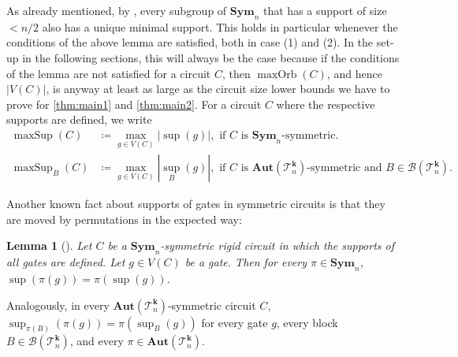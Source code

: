 \documentclass[11pt]{article}
\DeclareMathOperator{\supp}{sup}
\DeclareMathOperator{\maxSup}{maxSup}
\newcommand{\Aut}{\mathbf{Aut}}
\newcommand{\Sym}{\mathbf{Sym}}
\newcommand{\Bb}{{\mathcal B}}
\newcommand{\Oo}{{\mathcal O}}
\newcommand{\Tt}{{\mathcal T}}
\theoremstyle{definition}
\theoremstyle{plain}
\newtheorem{lemma}[definition]{Lemma}
\theoremstyle{remark}
\theoremstyle{remark}
\newcommand{\maxorb}{\operatorname{maxOrb}}
\renewcommand{\epsilon}{\varepsilon}
\begin{document}
As already mentioned, by \cite[Lemma 26]{blass1999choiceless}, every subgroup of $\Sym_n$ that has a support of size $< n/2$ also has a unique minimal support.
This holds in particular whenever the conditions of the above lemma are satisfied, both in case (1) and (2). In the set-up in the following sections, this will always be the case because if the conditions of the lemma are not satisfied for a circuit $C$, then $\maxorb(C)$, and hence $|V(C)|$, is anyway at least as large as the circuit size lower bounds we have to prove for \cref{thm:main1} and \cref{thm:main2}.
For a circuit $C$ where the respective supports are defined, we write
\begin{align*}
	\maxSup(C) &\coloneqq \max_{g \in V(C)} |\supp(g)|, \text{ if } C \text{ is } \Sym_n\text{-symmetric} .\\
	\maxSup_{B}(C) &\coloneqq \max_{g \in V(C)} |\supp_{B}(g)|, \text{ if } C \text{ is } \Aut(\Tt_n^{\boldsymbol{k}})\text{-symmetric}
	 \text{ and } B \in \Bb(\Tt_n^{\boldsymbol{k}}).
\end{align*}



Another known fact about supports of gates in symmetric circuits is that they are moved by permutations in the expected way:
\begin{lemma}[{\cite[Lemma 4.2]{arxivVersionSymAlgebraicCircuits}}]
	\label{lem:supportsMoveWithPermutation}
	Let $C$ be a $\Sym_n$-symmetric rigid circuit in which the supports of all gates are defined. Let $g \in V(C)$ be a gate. Then for every $\pi \in \Sym_n$, $\supp(\pi(g)) = \pi(\supp(g))$. 
\end{lemma}	 
Analogously, in every $\Aut(\Tt_n^{\boldsymbol{k}})$-symmetric circuit $C$, $\supp_{\pi(B)}(\pi(g)) = \pi(\supp_B(g))$ for every gate $g$, every block $B \in \Bb(\Tt_n^{\boldsymbol{k}})$, and every $\pi \in \Aut(\Tt_n^{\boldsymbol{k}})$.









\end{document}
